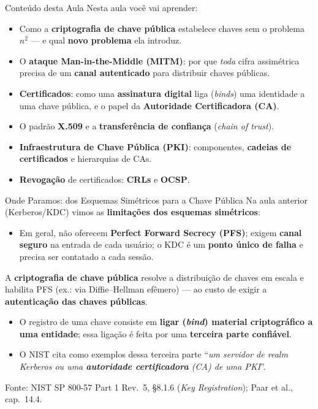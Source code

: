 \documentclass{beamer}
\begin{document}
\begin{frame}{Conteúdo desta Aula}
    \vspace{0.5em}
    Nesta aula você vai aprender:
    \begin{itemize}
        \item Como a \textbf{criptografia de chave pública} estabelece chaves sem o problema $n^2$ --- e qual \textbf{novo problema} ela introduz.
        \medskip
        \item O \textbf{ataque Man-in-the-Middle (MITM)}: por que \emph{toda} cifra assimétrica precisa de um \textbf{canal autenticado} para distribuir chaves públicas.
        \medskip
        \item \textbf{Certificados}: como uma \textbf{assinatura digital} liga (\textit{binds}) uma identidade a uma chave pública, e o papel da \textbf{Autoridade Certificadora (CA)}.
        \medskip
        \item O padrão \textbf{X.509} e a \textbf{transferência de confiança} (\textit{chain of trust}).
        \medskip
        \item \textbf{Infraestrutura de Chave Pública (PKI)}: componentes, \textbf{cadeias de certificados} e hierarquias de CAs.
        \medskip
        \item \textbf{Revogação} de certificados: \textbf{CRLs} e \textbf{OCSP}.
    \end{itemize}
\end{frame}

\begin{frame}{Onde Paramos: dos Esquemas Simétricos para a Chave Pública}
    Na aula anterior (Kerberos/KDC) vimos as \textbf{limitações dos esquemas simétricos}:
    \begin{itemize}
        \footnotesize
        \item Em geral, não oferecem \textbf{Perfect Forward Secrecy (PFS)}; exigem \textbf{canal seguro} na entrada de cada usuário; o KDC é um \textbf{ponto único de falha} e precisa ser contatado a cada sessão.
    \end{itemize}
    \medskip
    \begin{tcolorbox}[colback=green!6,colframe=green!50!black,boxrule=0.5pt]
        \footnotesize
        A \textbf{criptografia de chave pública} resolve a distribuição de chaves em escala e habilita PFS (ex.: via Diffie--Hellman efêmero) --- \alert{ao custo} de exigir a \textbf{autenticação das chaves públicas}.
    \end{tcolorbox}
    \medskip
    \begin{itemize}
        \footnotesize
        \item O registro de uma chave consiste em \textbf{ligar (\textit{bind}) material criptográfico a uma entidade}; essa ligação é feita por uma \textbf{terceira parte confiável}.
        \item O NIST cita como exemplos dessa terceira parte ``\emph{um servidor de \textit{realm} Kerberos ou uma \textbf{autoridade certificadora} (CA) de uma PKI}''.
    \end{itemize}
    \smallskip
    {\tiny Fonte: NIST SP 800-57 Part 1 Rev.\ 5, §8.1.6 (\textit{Key Registration}); Paar et al., cap.\ 14.4.}
\end{frame}
\end{document}
